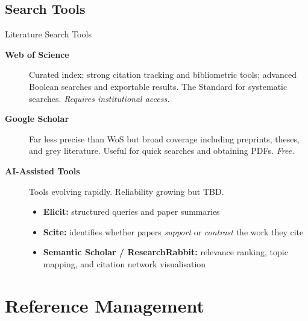 \documentclass{beamer}
\begin{document}
\subsection{Search Tools}
\begin{frame}{Literature Search Tools}

  \footnotesize
  \begin{description}
    \item[\textbf{Web of Science}]
      Curated index; strong citation tracking and bibliometric
      tools; advanced Boolean searches and exportable
      results. The Standard for systematic searches.
      {\scriptsize \textit{Requires institutional access.}}

    \item[\textbf{Google Scholar}]
      Far less precise than WoS but broad coverage including preprints, theses, and
      grey literature. 
      Useful for quick searches and obtaining PDFs.
      {\scriptsize \textit{Free.}}

    \item[\textbf{AI-Assisted Tools}]
       {\scriptsize Tools evolving rapidly. Reliability growing but TBD.}\\
      \begin{itemize}\footnotesize
        \item \textbf{Elicit:} structured queries
          and paper summaries
        \item \textbf{Scite:} identifies whether papers \emph{support} or
          \emph{contrast} the work they cite
        \item \textbf{Semantic Scholar / ResearchRabbit:}
          relevance ranking, topic mapping, and citation
          network visualisation
      \end{itemize}
  \end{description}

\end{frame}


\section{Reference Management}
\end{document}
